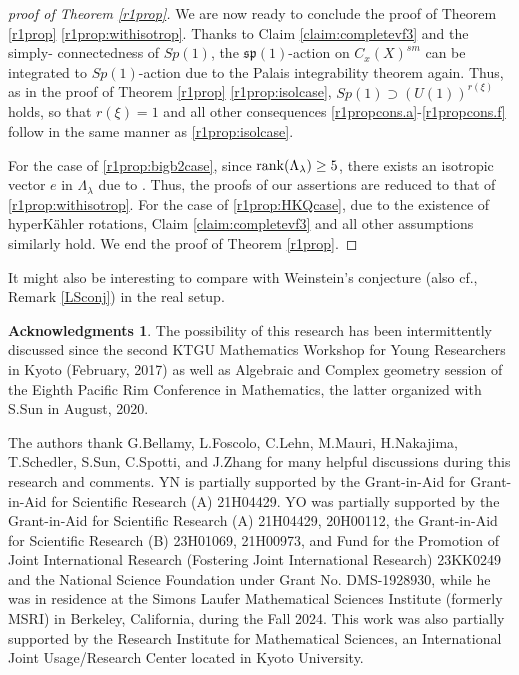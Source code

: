 \documentclass[12pt,a4paper]{amsart}
\theoremstyle{remark}
\theoremstyle{definition}
\newtheorem*{ack}{Acknowledgments}
\begin{document}
\begin{proof}[proof of Theorem \ref{r1prop}]
We are now ready to conclude the proof of 
Theorem \ref{r1prop} \eqref{r1prop:withisotrop}. 
Thanks to 
Claim \ref{claim:completevf3} and the simply-
connectedness of $Sp(1)$, 
the $\mathfrak{sp}(1)$-action on $C_x(X)^{sm}$ 
can be integrated to $Sp(1)$-action due to the 
Palais integrability theorem again. 
Thus, as in the proof of 
Theorem \ref{r1prop} 
\eqref{r1prop:isolcase}, 
$Sp(1)\supset (U(1))^{r(\xi)}$ holds, so that $r(\xi)=1$ and all other consequences 
\ref{r1propcons.a}-\ref{r1propcons.f} 
follow in the same manner as 
\eqref{r1prop:isolcase}. 

For the case of \eqref{r1prop:bigb2case}, 
since ${\rm rank}(\Lambda_\lambda)\ge 
5$, there exists an isotropic vector $e$ in $\Lambda_\lambda$ 
due to 
\cite[Chapter IV, Corollary 2 (p43)]{Serre.arith}. 
Thus, the proofs of our assertions 
are reduced to that of \eqref{r1prop:withisotrop}. 
For the case of \eqref{r1prop:HKQcase}, 
due to the existence of hyperK\"ahler rotations, 
Claim \ref{claim:completevf3} and all other assumptions similarly hold. 
We end the proof of Theorem \ref{r1prop}. 
\end{proof}

It might also be interesting to compare with 
Weinstein's conjecture 
\cite{Weinstein} (also cf., Remark 
\ref{LSconj}) in the real setup. 







\begin{ack}
The possibility of this research has been 
intermittently discussed since 
the second KTGU Mathematics Workshop for Young Researchers in 
Kyoto (February, 2017) 
as well as Algebraic and Complex geometry session of 
the Eighth Pacific Rim Conference in Mathematics, the latter 
organized with S.Sun in August, 2020. 

The authors thank G.Bellamy, L.Foscolo, C.Lehn, M.Mauri, H.Nakajima, T.Schedler, S.Sun, C.Spotti, and 
J.Zhang for many helpful discussions during this research and comments. 
YN is partially supported by the Grant-in-Aid for 
Grant-in-Aid for Scientific Research (A) 21H04429. 
YO was partially supported by the 
Grant-in-Aid for Scientific Research (A) 21H04429, 
20H00112, 
the Grant-in-Aid for  Scientific Research (B) 23H01069, 
21H00973, 
and Fund for the Promotion of Joint International Research 
(Fostering Joint International Research) 23KK0249 
and the National Science 
Foundation under Grant No. DMS-1928930, while he was in
residence at the Simons Laufer Mathematical Sciences Institute
(formerly MSRI) in Berkeley, California, during the Fall 2024. 
This work was also 
partially supported by the Research Institute for Mathematical Sciences, 
an International Joint Usage/Research Center located in Kyoto University. 
\end{ack}
\end{document}
